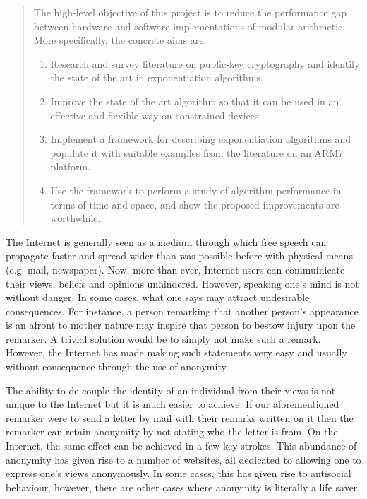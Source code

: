\documentclass[ %
                    author={Luke Murray},
                supervisor={Dr. Simon Hollis},
                     title={Shadow Peer-to-Peer Networks},
                  subtitle={},
                    degree={MEng},
                      year={2013} ]{thesis}
\begin{document}
\begin{quote}
\noindent
The high-level objective of this project is to reduce the performance 
gap between hardware and software implementations of modular arithmetic.  
More specifically, the concrete aims are:

\begin{enumerate}
\item Research and survey literature on public-key cryptography and
      identify the state of the art in exponentiation algorithms.
\item Improve the state of the art algorithm so that it can be used
      in an effective and flexible way on constrained devices.
\item Implement a framework for describing exponentiation algorithms
      and populate it with suitable examples from the literature on 
      an ARM7 platform.
\item Use the framework to perform a study of algorithm performance
      in terms of time and space, and show the proposed improvements
      are worthwhile.
\end{enumerate}
\end{quote}

The Internet is generally seen as a medium through which free speech can propagate faster and spread wider than was possible before with physical means (e.g. mail, newspaper). Now, more than ever, Internet users can commuinicate their views, beliefs and opinions unhindered. However, speaking one's mind is not without danger. In some cases, what one says may attract undesirable consequences. For instance, a person remarking that another person's appearance is an afront to mother nature may inspire that person to bestow injury upon the remarker. A trivial solution would be to simply not make such a remark. However, the Internet has made making such statements very easy and usually without consequence through the use of anonymity.

The ability to de-couple the identity of an individual from their views is not unique to the Internet but it is much easier to achieve. If our aforementioned remarker were to send a letter by mail with their remarks written on it then the remarker can retain anonymity by not stating who the letter is from. On the Internet, the same effect can be achieved in a few key strokes. This abundance of anonymity has given rise to a number of websites, all dedicated to allowing one to express one's views anonymously. In some cases, this has given rise to antisocial behaviour, however, there are other cases where anonymity is literally a life saver.
\end{document}
